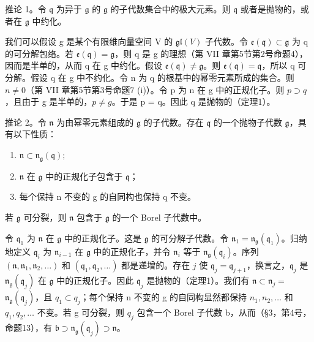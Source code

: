 推论 1。令 \(\mathfrak{q}\) 为异于 \(\mathfrak{g}\) 的 \(\mathfrak{g}\) 的子代数集合中的极大元素。则 \(\mathfrak{q}\) 或者是抛物的，或者在 \(\mathfrak{g}\) 中约化。

我们可以假设 g 是某个有限维向量空间 V 的 \(\mathfrak{gl}(V)\) 子代数。令 \(\mathfrak{e}(\mathfrak{q}) \subset \mathfrak{g}\) 为 q 的可分解包络。若 \(\mathfrak{e}(\mathfrak{q}) = \mathfrak{g}\)，则 q 是 g 的理想（第 VII 章第5节第2号命题4），因而是半单的，从而 q 在 g 中约化。假设 \(\mathfrak{e}(\mathfrak{q}) \neq \mathfrak{g}\)。则 \(\mathfrak{e}(\mathfrak{q}) = \mathfrak{q}\)，所以 q 可分解。假设 q 在 g 中不约化。令 n 为 q 的根基中的幂零元素所成的集合。则 \(n \neq 0\)（第 VII 章第5节第3号命题7 (i)）。令 p 为 n 在 g 中的正规化子。则 \(p \supset q\)，且由于 g 是半单的，\(p \neq g\)。于是 p = q。因此 q 是抛物的（定理1）。

推论 2。令 \(\mathfrak{n}\) 为由幂零元素组成的 \(\mathfrak{g}\) 的子代数。存在 \(\mathfrak{q}\) 的一个抛物子代数 \(\mathfrak{g}\)，具有以下性质：

\begin{enumerate}
\def\labelenumi{(\roman{enumi})}
\item
  \(\mathfrak{n}\subset \mathfrak{n}_{\mathfrak{g}}(\mathfrak{q});\)
\item
  \(\mathfrak{n}\) 在 \(\mathfrak{g}\) 中的正规化子包含于 \(\mathfrak{q}\)；
\item
  每个保持 n 不变的 g 的自同构也保持 q 不变。
\end{enumerate}

若 \(\mathfrak{g}\) 可分裂，则 \(\mathfrak{n}\) 包含于 \(\mathfrak{g}\) 的一个 Borel 子代数中。

令 \(\mathfrak{q}_1\) 为 \(\mathfrak{n}\) 在 \(\mathfrak{g}\) 中的正规化子。这是 \(\mathfrak{g}\) 的可分解子代数。令 \(\mathfrak{n}_1 = \mathfrak{n}_{\mathfrak{g}}(\mathfrak{q}_1)\)。归纳地定义 \(\mathfrak{q}_i\) 为 \(\mathfrak{n}_{i-1}\) 在 \(\mathfrak{g}\) 中的正规化子，并令 \(\mathfrak{n}_i\) 等于 \(\mathfrak{n}_{\mathfrak{g}}(\mathfrak{q}_i)\)。序列 \((\mathfrak{n}, \mathfrak{n}_1, \mathfrak{n}_2, \ldots)\) 和 \((\mathfrak{q}_1, \mathfrak{q}_2, \ldots)\) 都是递增的。存在 \(j\) 使 \(\mathfrak{q}_j = \mathfrak{q}_{j+1}\)，换言之，\(\mathfrak{q}_j\) 是 \(\mathfrak{n}_{\mathfrak{g}}(\mathfrak{q}_j)\) 在 \(\mathfrak{g}\) 中的正规化子。因此 \(\mathfrak{q}_j\) 是抛物的（定理1）。我们有 \(\mathfrak{n} \subset \mathfrak{n}_j =\) \(\mathfrak{n}_{\mathfrak{g}}(\mathfrak{q}_{j})\)，且 \(q_{1} \subset q_{j}\)；每个保持 n 不变的 g 的自同构显然都保持 \(n_{1}, n_{2}, \ldots\) 和 \(q_{1}, q_{2}, \ldots\) 不变。若 g 可分裂，则 \(q_{j}\) 包含一个 Borel 子代数 b，从而（§3，第4号，命题13），有 \(\mathfrak{b} \supset \mathfrak{n}_{\mathfrak{g}}(\mathfrak{q}_{j}) \supset \mathfrak{n}\)。


